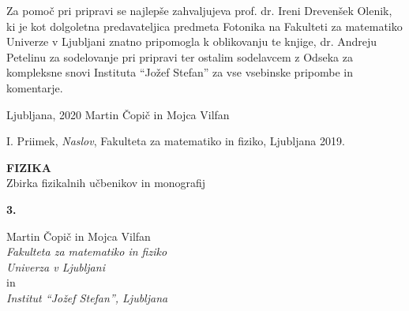 \documentclass[a4paper,10pt,fleqn]{book}
\begin{document}
Za pomoč pri pripravi se najlepše zahvaljujeva prof. dr. Ireni Drevenšek Olenik, ki je 
kot dolgoletna predavateljica predmeta Fotonika na Fakulteti za 
matematiko Univerze v Ljubljani znatno pripomogla k oblikovanju 
te knjige, dr. Andreju Petelinu za sodelovanje pri pripravi ter 
ostalim sodelavcem z Odseka za kompleksne snovi 
Instituta ``Jožef Stefan'' za vse vsebinske pripombe
in komentarje.

\vspace{1em}

Ljubljana, 2020
\hfill 
Martin Čopič in Mojca Vilfan


\lihastran
\tableofcontents


\lihastran













\lihastran
{}
\begin{thebibliography}{9}

   I. Priimek,
   \emph{Naslov},
   Fakulteta za matematiko in fiziko, Ljubljana 2019.

\end{thebibliography}


\lihastran
{}
\sloppy
\raggedright
\footnotesize
\printindex
\normalsize


\sodastran
\thispagestyle{empty}
\parindent=0pt

\textbf{FIZIKA} \\
Zbirka fizikalnih učbenikov in monografij

\bigskip
\bigskip
\textbf{\large 3.}

\bigskip
Martin Čopič in Mojca Vilfan\\
{\it Fakulteta za matematiko in fiziko\\
Univerza v Ljubljani}\\
in\\
{\it Institut ``Jožef Stefan'', Ljubljana}\\
\end{document}
